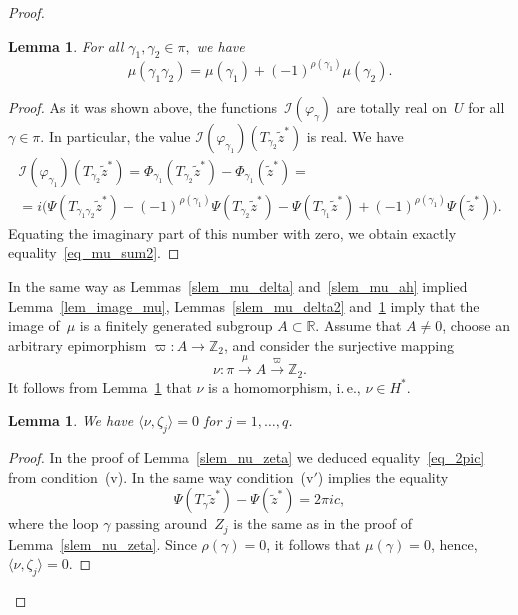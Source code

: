 \documentclass[reqno,tbtags,12pt]{amsart}
\numberwithin{equation}{section}
\newcommand{\R}{\mathbb{R}}
\newcommand{\Z}{\mathbb{Z}}
\newcommand{\I}{\mathcal{I}}
\newcommand{\tz}{\tilde{z}}
\newtheorem{lem}[theorem]{Lemma}
\theoremstyle{definition}
\begin{document}
\begin{proof}
\begin{lem}\label{slem_mu_ah2}
For all\/ $\gamma_1,\gamma_2\in\pi,$ we have
\begin{equation}\label{eq_mu_sum2}
\mu(\gamma_1\gamma_2)=\mu(\gamma_1)+(-1)^{\rho(\gamma_1)}\mu(\gamma_2).
\end{equation}
\end{lem}

\begin{proof}
As it was shown above, the functions~$\I(\varphi_{\gamma})$ are totally real on~$U$ for all $\gamma\in\pi$. In particular, the value $\I(\varphi_{\gamma_1})(T_{\gamma_2}\tz^*)$ is real. We have
\begin{multline*}
\I(\varphi_{\gamma_1})(T_{\gamma_2}\tz^*)=\Phi_{\gamma_1}(T_{\gamma_2}\tz^*)-\Phi_{\gamma_1}(\tz^*)={}\\{}=i\bigl(\Psi(T_{\gamma_1\gamma_2}\tz^*)-(-1)^{\rho(\gamma_1)}\Psi(T_{\gamma_2}\tz^*)
-\Psi(T_{\gamma_1}\tz^*)+(-1)^{\rho(\gamma_1)}\Psi(\tz^*)
\bigr).
\end{multline*}
Equating the imaginary part of this number with zero, we obtain exactly equality~\eqref{eq_mu_sum2}.
\end{proof}

In the same way as Lemmas~\ref{slem_mu_delta} and~\ref{slem_mu_ah} implied Lemma~\ref{lem_image_mu}, Lemmas~\ref{slem_mu_delta2} and~\ref{slem_mu_ah2} imply that the image of~$\mu$ is a finitely generated subgroup $A\subset\R$.  Assume that $A\ne 0$, choose an arbitrary epimorphism $\varpi\colon A\to\Z_2$, and consider the surjective mapping
$$
\nu\colon\pi\xrightarrow{\mu}A\xrightarrow{\varpi}\Z_2.
$$
It follows from Lemma~\ref{slem_mu_ah2}  that $\nu$ is a homomorphism, i.\,e., $\nu\in H^*$.

\begin{lem}\label{slem_nu_zeta2}
We have $\langle\nu,\zeta_j\rangle=0$ for $j=1,\ldots,q$.
\end{lem}
\begin{proof}
In the proof of Lemma~\ref{slem_nu_zeta} we deduced equality~\eqref{eq_2pic} from condition~(v). In the same way condition~(v${}'$) implies the equality 
\begin{equation*}
\Psi(T_{\gamma}\tilde z^*)-\Psi(\tz^*)=2\pi i c,
\end{equation*}
where the loop $\gamma$ passing around~$Z_j$ is the same as in the proof of Lemma~\ref{slem_nu_zeta}. Since $\rho(\gamma)=0$, it follows that $\mu(\gamma)=0$, hence, $\langle\nu,\zeta_j\rangle=0$. 
\end{proof}



\end{proof}
\end{document}
